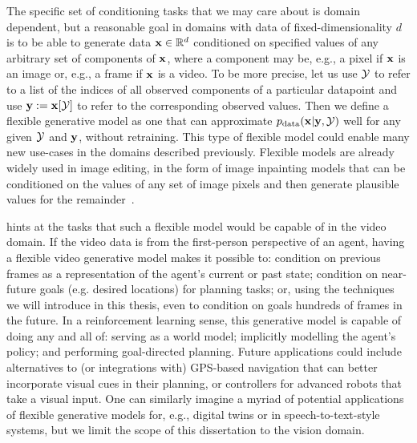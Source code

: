The specific set of conditioning tasks that we may care about is domain dependent, but a reasonable goal in domains with data of fixed-dimensionality $d$ is to be able to generate data ${\mathbf{x}} \in \mathbb{R}^d$ conditioned on specified values of any arbitrary set of components of ${\mathbf{x}}$, where a component may be, e.g., a pixel if ${\mathbf{x}}$ is an image or, e.g., a frame if ${\mathbf{x}}$ is a video. To be more precise,
let us use ${\mathcal{Y}}$ to refer to a list of the indices of all observed components of a particular datapoint and use ${\mathbf{y}} := {\mathbf{x}}[{\mathcal{Y}}]$ to refer to the corresponding observed values. Then we define a flexible generative model as one that can approximate $p_{\rm{data}}({\mathbf{x}}|{\mathbf{y}},{\mathcal{Y}})$ well for any given ${\mathcal{Y}}$ and ${\mathbf{y}}$, without retraining. This type of flexible model could enable many new use-cases in the domains described previously. Flexible models are already widely used in image editing, in the form of image inpainting models that can be conditioned on the values of any set of image pixels and then generate plausible values for the remainder~\citep{rombach2022high,zhao2021large,harvey2021conditional}.

 hints at the tasks that such a flexible model would be capable of in the video domain. If the video data is from the first-person perspective of an agent, having a flexible video generative model makes it possible to: condition on previous frames as a representation of the agent's current or past state; condition on near-future goals (e.g. desired locations) for planning tasks; or, using the techniques we will introduce in this thesis, even to condition on goals hundreds of frames in the future. In a reinforcement learning sense, this generative model is capable of doing any and all of: serving as a world model; implicitly modelling the agent's policy; and performing goal-directed planning. Future applications could include alternatives to (or integrations with) GPS-based navigation that can better incorporate visual cues in their planning, or controllers for advanced robots that take a visual input. One can similarly imagine a myriad of potential applications of flexible generative models for, e.g., digital twins or in speech-to-text-style systems, but we limit the scope of this dissertation to the vision domain.

